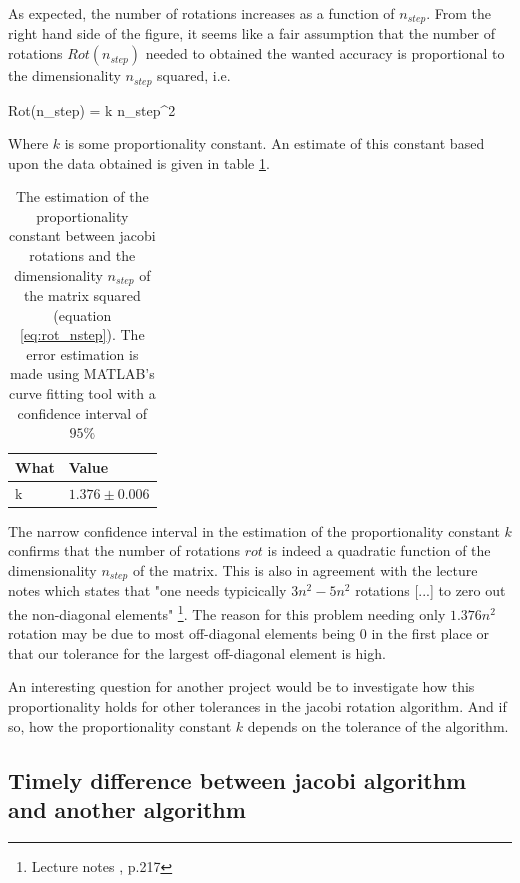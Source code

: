 \documentclass[a4paper,10pt,english]{article}
\numberwithin{figure}{subsection}
\numberwithin{table}{subsection}
\numberwithin{equation}{subsection}
\begin{document}
As expected, the number of rotations increases as a function of $n_{step}$. 
From the right hand side of the figure, it seems like a fair assumption that the number of 
rotations $Rot (n_{step})$ needed to obtained the wanted accuracy 
 is proportional to the dimensionality $n_{step}$ squared, i.e.

\eqs 
Rot(n_{step}) = k n_{step}^2 
\label{eq:rot_nstep}
\eqf

Where $k$ is some proportionality constant. 
An estimate of this constant based upon the data obtained is given in table \ref{tab:rot_nstep}.

\begin{table}[h!]
  \centering 
  \begin{tabular}{ll}
  \toprule
  What & Value \\
  \midrule
  k &  $ 1.376 \pm 0.006 $ \\
  \bottomrule
  \end{tabular}

  \caption{The estimation of the proportionality constant between jacobi rotations 
          and the dimensionality $n_{step}$ of the matrix squared (equation \ref{eq:rot_nstep}).
          The error estimation is made using MATLAB's curve fitting tool with a confidence interval 
          of $95\%$}
  \label{tab:rot_nstep}
\end{table}

The narrow confidence interval in the estimation of the proportionality constant $k$ 
confirms that the number of rotations $rot$ is indeed a quadratic function of 
the dimensionality $n_{step}$ of the matrix. 
This is also in agreement with the lecture notes 
which states that 
"one needs typicically $3n^2 - 5n^2$ rotations [...] to zero out the non-diagonal elements"
\footnote{Lecture notes \cite{lecturenotes}, p.217}.
The reason for this problem needing only $1.376 n^2$ rotation may be  
due to most off-diagonal elements being $0$ in the first place 
or that our tolerance for the largest off-diagonal element is 
high. 

An interesting question for another project would be to investigate how this
proportionality holds for other tolerances in the jacobi rotation algorithm. 
And if so, how the proportionality constant $k$ depends on the tolerance of the 
algorithm.


\subsection{Timely difference between jacobi algorithm and another algorithm}
\end{document}
